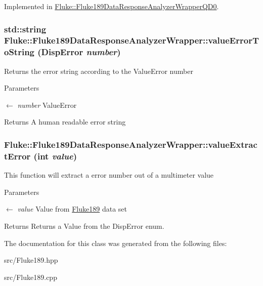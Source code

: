 Implemented in \hyperlink{classFluke_1_1Fluke189DataResponseAnalyzerWrapperQD0_aad8855dc897cc83a4a7b4df79657a724}{Fluke::Fluke189DataResponseAnalyzerWrapperQD0}.\hypertarget{classFluke_1_1Fluke189DataResponseAnalyzerWrapper_aa12dd607815d6ee1530a54855a4b3264}{
\subsubsection[{valueErrorToString}]{\setlength{\rightskip}{0pt plus 5cm}std::string Fluke::Fluke189DataResponseAnalyzerWrapper::valueErrorToString ({\bf DispError} {\em number})}}
\label{classFluke_1_1Fluke189DataResponseAnalyzerWrapper_aa12dd607815d6ee1530a54855a4b3264}
Returns the error string according to the ValueError number 
\begin{DoxyParams}{Parameters}
\item[\mbox{$\leftarrow$} {\em number}]ValueError \end{DoxyParams}
\begin{DoxyReturn}{Returns}
A human readable error string 
\end{DoxyReturn}
\hypertarget{classFluke_1_1Fluke189DataResponseAnalyzerWrapper_ab12ae68ca8c80dce4a952811825de465}{
\subsubsection[{valueExtractError}]{ Fluke::Fluke189DataResponseAnalyzerWrapper::valueExtractError (int {\em value})}}
\label{classFluke_1_1Fluke189DataResponseAnalyzerWrapper_ab12ae68ca8c80dce4a952811825de465}
This function will extract a error number out of a multimeter value 
\begin{DoxyParams}{Parameters}
\item[\mbox{$\leftarrow$} {\em value}]Value from \hyperlink{classFluke_1_1Fluke189}{Fluke189} data set \end{DoxyParams}
\begin{DoxyReturn}{Returns}
Returns a Value from the DispError enum. 
\end{DoxyReturn}


The documentation for this class was generated from the following files:\begin{DoxyCompactItemize}
\item 
src/Fluke189.hpp\item 
src/Fluke189.cpp\end{DoxyCompactItemize}
